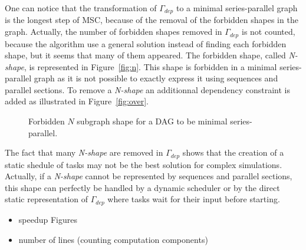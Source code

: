 
One can notice that the transformation of $\Gamma_{dep}$ to a minimal series-parallel graph is the longest step of MSC, because of the removal of the forbidden shapes in the graph. Actually, the number of forbidden shapes removed in $\Gamma_{dep}$ is not counted, because the algorithm use a general solution instead of finding each forbidden shape, but it seems that many of them appeared. The forbidden shape, called \emph{N-shape}, is represented in Figure~\ref{fig:n}. This shape is forbidden in a minimal series-parallel graph as it is not possible to exactly express it using sequences and parallel sections. To remove a \emph{N-shape} an additionnal dependency constraint is added as illustrated in Figure~\ref{fig:over}.

\begin{figure}[h!]
\begin{center}
  \hspace{25pt}
  \caption{Forbidden $N$ subgraph shape for a DAG to be minimal series-parallel.}
  \label{fig:forbidden}
\end{center}
\end{figure}

The fact that many \emph{N-shape} are removed in $\Gamma_{dep}$ shows that the creation of a static shedule of tasks may not be the best solution for complex simulations. Actually, if a \emph{N-shape} cannot be represented by sequences and parallel sections, this shape can perfectly be handled by a dynamic scheduler or by the direct static representation of $\Gamma_{dep}$ where tasks wait for their input before starting.


\begin{itemize}
\item speedup Figures
\item number of lines (counting computation components)
\end{itemize}